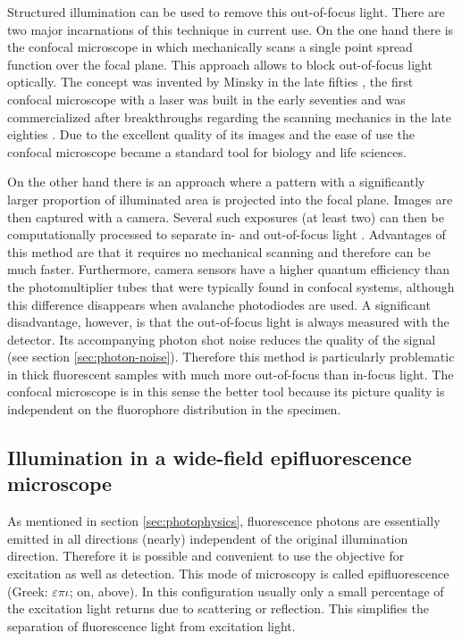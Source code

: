 Structured 
illumination can be used to remove this out-of-focus light.  There are
two major incarnations of this technique in current use.  On the one
hand there is the confocal microscope\label{sec:confocal} in which
mechanically scans a single point spread function over the focal
plane. This approach allows to block out-of-focus light optically. The
concept was invented by Minsky in the late fifties \citep{Minsky1961},
the first confocal microscope with a laser was built in the early
seventies \citep{davidovits1971scanning} and was commercialized after
breakthroughs regarding the scanning mechanics in the late eighties
\cite{Amos1987}. Due to the excellent quality of its images and the
ease of use the confocal microscope became a standard tool for biology
and life sciences.

On  the other
hand there is an approach where a pattern with a significantly larger
proportion of illuminated area is projected into the focal
plane. Images are then captured with a camera. Several such exposures
(at least two) can then be computationally processed to separate in-
and out-of-focus light \citep{Neil1997}.  Advantages of this method
are that it requires no mechanical scanning and therefore can be much
faster. Furthermore, camera sensors have a higher quantum efficiency
than the photomultiplier tubes that were typically found in confocal
systems, although this difference disappears when avalanche
photodiodes are used. A significant disadvantage, however, is that the
out-of-focus light is always measured with the detector. Its
accompanying photon shot noise reduces the quality of the signal (see
section \ref{sec:photon-noise}). Therefore this method is particularly
problematic in thick fluorescent samples with much more out-of-focus
than in-focus light. The confocal microscope is in this sense the
better tool because its picture quality is independent on the
fluorophore distribution in the specimen. 



\subsection{Illumination in a wide-field epifluorescence microscope}
As mentioned in section \ref{sec:photophysics}, fluorescence photons
are essentially emitted in all directions (nearly) independent of the
original illumination direction. Therefore it is possible and
convenient to use the objective for excitation as well as
detection. This mode of microscopy is called epifluorescence (Greek:
$\varepsilon\pi\iota$; on, above).  In this configuration usually only
a small percentage of the excitation light returns due to scattering
or reflection. This simplifies the separation of fluorescence light
from excitation light.

